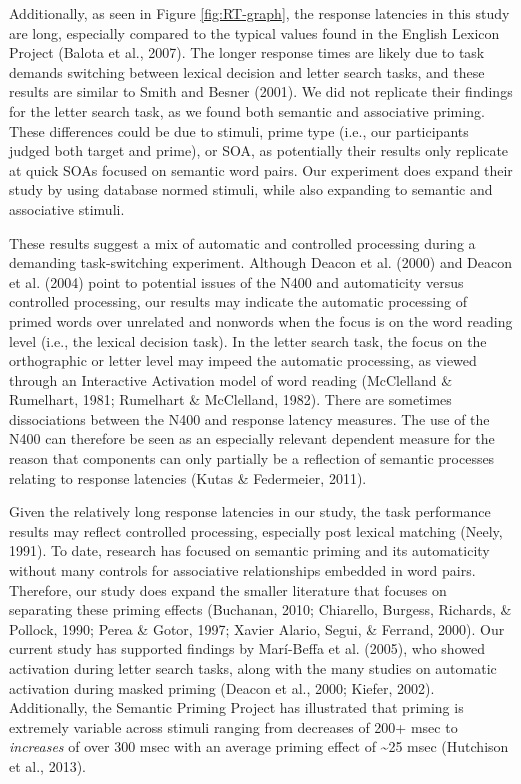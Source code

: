 \documentclass[english,man]{apa6}
\theoremstyle{definition}
\theoremstyle{definition}
\theoremstyle{definition}
\theoremstyle{remark}
\begin{document}
Additionally, as seen in Figure \ref{fig:RT-graph}, the response
latencies in this study are long, especially compared to the typical
values found in the English Lexicon Project (Balota et al., 2007). The
longer response times are likely due to task demands switching between
lexical decision and letter search tasks, and these results are similar
to Smith and Besner (2001). We did not replicate their findings for the
letter search task, as we found both semantic and associative priming.
These differences could be due to stimuli, prime type (i.e., our
participants judged both target and prime), or SOA, as potentially their
results only replicate at quick SOAs focused on semantic word pairs. Our
experiment does expand their study by using database normed stimuli,
while also expanding to semantic and associative stimuli.

These results suggest a mix of automatic and controlled processing
during a demanding task-switching experiment. Although Deacon et al.
(2000) and Deacon et al. (2004) point to potential issues of the N400
and automaticity versus controlled processing, our results may indicate
the automatic processing of primed words over unrelated and nonwords
when the focus is on the word reading level (i.e., the lexical decision
task). In the letter search task, the focus on the orthographic or
letter level may impeed the automatic processing, as viewed through an
Interactive Activation model of word reading (McClelland \& Rumelhart,
1981; Rumelhart \& McClelland, 1982). There are sometimes dissociations
between the N400 and response latency measures. The use of the N400 can
therefore be seen as an especially relevant dependent measure for the
reason that components can only partially be a reflection of semantic
processes relating to response latencies (Kutas \& Federmeier, 2011).

Given the relatively long response latencies in our study, the task
performance results may reflect controlled processing, especially post
lexical matching (Neely, 1991). To date, research has focused on
semantic priming and its automaticity without many controls for
associative relationships embedded in word pairs. Therefore, our study
does expand the smaller literature that focuses on separating these
priming effects (Buchanan, 2010; Chiarello, Burgess, Richards, \&
Pollock, 1990; Perea \& Gotor, 1997; Xavier Alario, Segui, \& Ferrand,
2000). Our current study has supported findings by Marí-Beffa et al.
(2005), who showed activation during letter search tasks, along with the
many studies on automatic activation during masked priming (Deacon et
al., 2000; Kiefer, 2002). Additionally, the Semantic Priming Project has
illustrated that priming is extremely variable across stimuli ranging
from decreases of 200+ msec to \emph{increases} of over 300 msec with an
average priming effect of \textasciitilde{}25 msec (Hutchison et al.,
2013).
\end{document}
